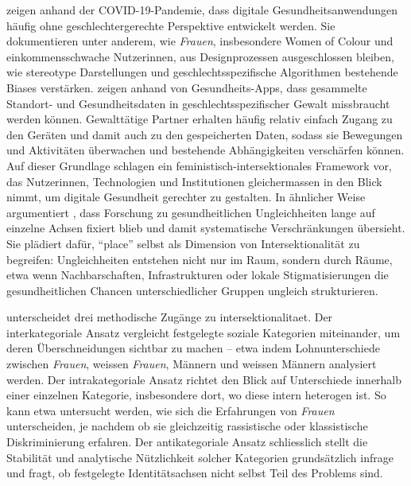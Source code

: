 \textcite{figueroaNeedFeministIntersectionality2021} zeigen anhand der COVID-19-Pandemie, dass digitale Gesundheitsanwendungen häufig ohne geschlechtergerechte Perspektive entwickelt werden. Sie dokumentieren unter anderem, wie \emph{Frauen}, insbesondere Women of Colour und einkommensschwache Nutzer\genderstern innen, aus Designprozessen ausgeschlossen bleiben, wie stereotype Darstellungen und geschlechtsspezifische Algorithmen bestehende Biases verstärken. \citeauthor{figueroaNeedFeministIntersectionality2021} zeigen anhand von Gesundheits-Apps, dass gesammelte Standort- und Gesundheitsdaten in geschlechtsspezifischer Gewalt missbraucht werden können. Gewalttätige Partner erhalten häufig relativ einfach Zugang zu den Geräten und damit auch zu den gespeicherten Daten, sodass sie Bewegungen und Aktivitäten überwachen und bestehende Abhängigkeiten verschärfen können. Auf dieser Grundlage schlagen \citeauthor{figueroaNeedFeministIntersectionality2021} ein feministisch-intersektionales Framework vor, das Nutzer\genderstern innen, Technologien und Institutionen gleichermassen in den Blick nimmt, um digitale Gesundheit gerechter zu gestalten. In ähnlicher Weise argumentiert \textcite{bambraPlacingIntersectionalInequalities2022}, dass Forschung zu gesundheitlichen Ungleichheiten lange auf einzelne Achsen fixiert blieb und damit systematische Verschränkungen übersieht. Sie plädiert dafür, \enquote{place} selbst als Dimension von Intersektionalität zu begreifen: Ungleichheiten entstehen nicht nur im Raum, sondern durch Räume, etwa wenn Nachbarschaften, Infrastrukturen oder lokale Stigmatisierungen die gesundheitlichen Chancen unterschiedlicher Gruppen ungleich strukturieren.

\textcite{mccallComplexityIntersectionality2005} unterscheidet drei methodische Zugänge zu \gls{intersektionalitaet}. Der interkategoriale Ansatz vergleicht festgelegte soziale Kategorien miteinander, um deren Überschneidungen sichtbar zu machen -- etwa indem Lohnunterschiede zwischen \emph{} \emph{Frauen}, weissen \emph{Frauen}, \emph{} Männern und weissen Männern analysiert werden. Der intrakategoriale Ansatz richtet den Blick auf Unterschiede innerhalb einer einzelnen Kategorie, insbesondere dort, wo diese intern heterogen ist. So kann etwa untersucht werden, wie sich die Erfahrungen von \emph{Frauen} unterscheiden, je nachdem ob sie gleichzeitig rassistische oder klassistische Diskriminierung erfahren. Der antikategoriale Ansatz schliesslich stellt die Stabilität und analytische Nützlichkeit solcher Kategorien grundsätzlich infrage und fragt, ob festgelegte Identitätsachsen nicht selbst Teil des Problems sind.

